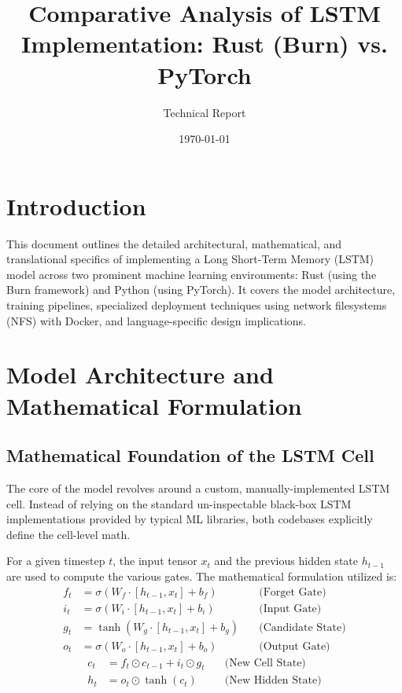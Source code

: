 \documentclass[12pt]{article}
\title{\textbf{Comparative Analysis of LSTM Implementation: Rust (Burn) vs. PyTorch}}
\author{Technical Report}
\date{\today}
\begin{document}
\maketitle
\tableofcontents
\newpage

\section{Introduction}
This document outlines the detailed architectural, mathematical, and translational specifics of implementing a Long Short-Term Memory (LSTM) model across two prominent machine learning environments: Rust (using the Burn framework) and Python (using PyTorch). It covers the model architecture, training pipelines, specialized deployment techniques using network filesystems (NFS) with Docker, and language-specific design implications.

\section{Model Architecture and Mathematical Formulation}

\subsection{Mathematical Foundation of the LSTM Cell}
The core of the model revolves around a custom, manually-implemented LSTM cell. Instead of relying on the standard un-inspectable black-box LSTM implementations provided by typical ML libraries, both codebases explicitly define the cell-level math. 

For a given timestep $t$, the input tensor $x_t$ and the previous hidden state $h_{t-1}$ are used to compute the various gates. The mathematical formulation utilized is:
\begin{align}
    f_t &= \sigma(W_f \cdot [h_{t-1}, x_t] + b_f) \quad &\text{(Forget Gate)} \\
    i_t &= \sigma(W_i \cdot [h_{t-1}, x_t] + b_i) \quad &\text{(Input Gate)} \\
    g_t &= \tanh(W_g \cdot [h_{t-1}, x_t] + b_g) \quad &\text{(Candidate State)} \\
    o_t &= \sigma(W_o \cdot [h_{t-1}, x_t] + b_o) \quad &\text{(Output Gate)}
\end{align}
\begin{align}
    c_t &= f_t \odot c_{t-1} + i_t \odot g_t \quad &\text{(New Cell State)} \\
    h_t &= o_t \odot \tanh(c_t) \quad &\text{(New Hidden State)}
\end{align}
\end{document}
